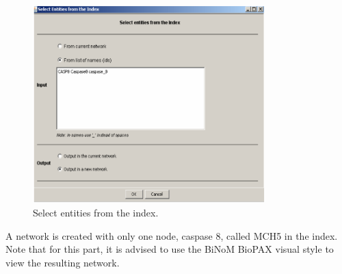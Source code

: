 \begin{figure}[h]
\centering
\includegraphics[width=0.8\textwidth]{graphics/Select_entities_from_index}
\caption{Select entities from the index.}
\label{Select_entities_from_index}
\end{figure}
A network is created with only one node, caspase 8, called MCH5 in the index. Note that for this part, it is advised to use the BiNoM BioPAX visual style to view the resulting network.

